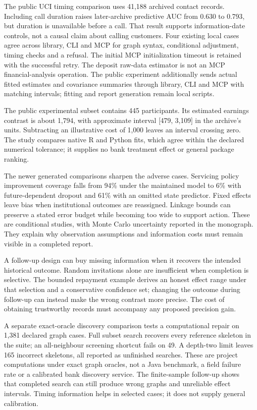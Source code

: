 The public UCI timing comparison uses 41,188 archived contact records.
Including call duration raises later-archive predictive AUC from 0.630 to
0.793, but duration is unavailable before a call. That result supports
information-date controls, not a causal claim about calling customers.
Four existing local cases agree across library, CLI and MCP for graph
syntax, conditional adjustment, timing checks and a refusal. The initial
MCP initialization timeout is retained with the successful retry. The
deposit raw-data estimator is not an MCP financial-analysis operation. The
public experiment additionally sends actual fitted estimates and covariance
summaries through library, CLI and MCP with matching intervals; fitting and
report generation remain local scripts.

The public experimental subset contains 445 participants. Its estimated
earnings contrast is about 1,794, with approximate interval [479, 3,109] in
the archive's units. Subtracting an illustrative cost of 1,000 leaves an
interval crossing zero. The study compares native R and Python fits, which
agree within the declared numerical tolerance; it supplies no bank treatment
effect or general package ranking.

The newer generated comparisons sharpen the adverse cases. Servicing policy
improvement coverage falls from 94\% under the maintained model to 6\% with
future-dependent dropout and 61\% with an omitted state predictor. Fixed
effects leave bias when institutional outcomes are reassigned. Linkage bounds
can preserve a stated error budget while becoming too wide to support action.
These are conditional studies, with Monte Carlo uncertainty reported in the
monograph. They explain why observation assumptions and information costs
must remain visible in a completed report.

A follow-up design can buy missing information when it recovers the intended
historical outcome. Random invitations alone are insufficient when completion
is selective. The bounded repayment example derives an honest effect range
under that selection and a conservative confidence set; changing the outcome
during follow-up can instead make the wrong contrast more precise. The cost
of obtaining trustworthy records must accompany any proposed precision gain.

A separate exact-oracle discovery comparison tests a computational repair on
1,381 declared graph cases. Full subset search recovers every reference
skeleton in the suite; an all-neighbour screening shortcut fails on 49.
A depth-two limit leaves 165 incorrect skeletons, all reported as unfinished
searches. These are project computations under exact graph oracles, not a
Java benchmark, a field failure rate or a calibrated bank discovery service. The
finite-sample follow-up shows that completed search can still produce wrong
graphs and unreliable effect intervals. Timing information helps in selected
cases; it does not supply general calibration.

